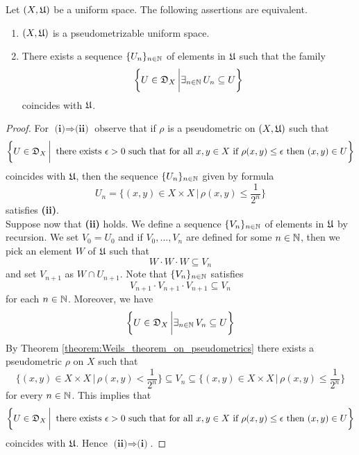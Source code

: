 \begin{theorem}\label{theorem:characterization_of_pseudometrizable_uniform_spaces}
Let $(X,{\mathfrak U})$ be a uniform space. The following assertions are equivalent.
\begin{enumerate}[label=\emph{\textbf{(\roman*)}}, leftmargin=*]
\item $(X,{\mathfrak U})$ is a pseudometrizable uniform space.
\item There exists a sequence $\{U_n\}_{n\in {\mathbb N}}$ of elements in ${\mathfrak U}$ such that the family
$$\bigg\{U\in {\mathfrak D}_{X}\,\bigg|\exists_{n\in {\mathbb N}}\,U_n \subseteq U\bigg\}$$
coincides with ${\mathfrak U}$.
\end{enumerate}
\end{theorem}
\begin{proof}
For $\textbf{(i)}\Rightarrow \textbf{(ii)}$ observe that if $\rho$ is a pseudometric on $(X,{\mathfrak U})$ such that 
$$\bigg\{U \in {\mathfrak D}_{X}\,\bigg|\,\mbox{ there exists }\epsilon>0\mbox{ such that for all }x,y\in X\mbox{ if }\rho(x,y)\leq \epsilon\mbox{ then }(x,y)\in U\bigg\}$$
coincides with ${\mathfrak U}$, then the sequence $\{U_n\}_{n\in {\mathbb N}}$ given by formula
$$U_n = \bigg\{(x,y)\in X\times X\,\bigg|\,\rho(x,y) \leq \frac{1}{2^n}\bigg\}$$
satisfies \textbf{(ii)}.\\
Suppose now that \textbf{(ii)} holds. We define a sequence $\{V_n\}_{n\in {\mathbb N}}$ of elements in ${\mathfrak U}$ by recursion. We set $V_0 = U_0$ and if $V_0,...,V_n$ are defined for some $n\in {\mathbb N}$, then we pick an element $W$ of ${\mathfrak U}$ such that 
$$W\cdot W\cdot W \subseteq V_n$$
and set $V_{n+1}$ as $W\cap U_{n+1}$. Note that $\{V_n\}_{n\in {\mathbb N}}$ satisfies
$$V_{n+1}\cdot V_{n+1}\cdot V_{n+1} \subseteq V_n$$
for each $n\in {\mathbb N}$. Moreover, we have
$$\bigg\{U\in {\mathfrak D}_{X}\,\bigg|\exists_{n\in {\mathbb N}}\,V_n \subseteq U\bigg\}$$
By Theorem \ref{theorem:Weils_theorem_on_pseudometrics} there exists a pseudometric $\rho$ on $X$ such that
$$\bigg\{(x,y)\in X\times X\,\bigg|\,\rho(x,y)<\frac{1}{2^n}\bigg\} \subseteq V_n \subseteq \bigg\{(x,y)\in X\times X\,\bigg|\,\rho(x,y) \leq \frac{1}{2^n}\bigg\}$$
for every $n\in {\mathbb N}$. This implies that
$$\bigg\{U \in {\mathfrak D}_{X}\,\bigg|\,\mbox{ there exists }\epsilon>0\mbox{ such that for all }x,y\in X\mbox{ if }\rho(x,y)\leq \epsilon\mbox{ then }(x,y)\in U\bigg\}$$
coincides with ${\mathfrak U}$. Hence $\textbf{(ii)}\Rightarrow \textbf{(i)}$.
\end{proof}

